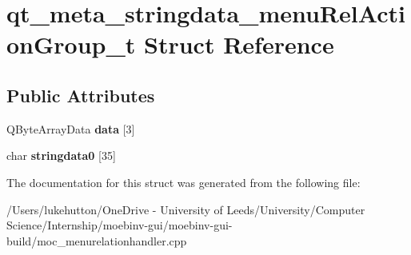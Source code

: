 \hypertarget{structqt__meta__stringdata__menu_rel_action_group__t}{}\section{qt\+\_\+meta\+\_\+stringdata\+\_\+menu\+Rel\+Action\+Group\+\_\+t Struct Reference}
\label{structqt__meta__stringdata__menu_rel_action_group__t}
\subsection*{Public Attributes}
\begin{DoxyCompactItemize}
\item 
\mbox{\label{structqt__meta__stringdata__menu_rel_action_group__t_ae7569401cbdb8cde6886a1120ca52cff}} 
Q\+Byte\+Array\+Data {\bfseries data} \mbox{[}3\mbox{]}
\item 
\mbox{\label{structqt__meta__stringdata__menu_rel_action_group__t_a16e48c6d600da8cd939d1fab23ece3ab}} 
char {\bfseries stringdata0} \mbox{[}35\mbox{]}
\end{DoxyCompactItemize}


The documentation for this struct was generated from the following file\+:\begin{DoxyCompactItemize}
\item 
/\+Users/lukehutton/\+One\+Drive -\/ University of Leeds/\+University/\+Computer Science/\+Internship/moebinv-\/gui/moebinv-\/gui-\/build/moc\+\_\+menurelationhandler.\+cpp\end{DoxyCompactItemize}
